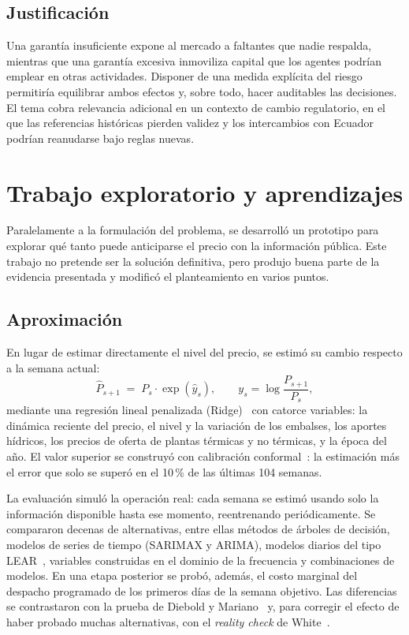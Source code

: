 \documentclass[11pt,letterpaper]{article}
\begin{document}
\subsection{Justificación}

Una garantía insuficiente expone al mercado a faltantes que nadie
respalda, mientras que una garantía excesiva inmoviliza capital que los
agentes podrían emplear en otras actividades. Disponer de una medida
explícita del riesgo permitiría equilibrar ambos efectos y, sobre todo,
hacer auditables las decisiones. El tema cobra relevancia adicional en
un contexto de cambio regulatorio, en el que las referencias históricas
pierden validez y los intercambios con Ecuador podrían reanudarse bajo
reglas nuevas.

\section{Trabajo exploratorio y aprendizajes}
\label{sec:avance}

Paralelamente a la formulación del problema, se desarrolló un prototipo
para explorar qué tanto puede anticiparse el precio con la información
pública. Este trabajo no pretende ser la solución definitiva, pero
produjo buena parte de la evidencia presentada y modificó el
planteamiento en varios puntos.

\subsection{Aproximación}

En lugar de estimar directamente el nivel del precio, se estimó su
cambio respecto a la semana actual:
\begin{equation}
  \hat P_{s+1} \;=\; P_s\cdot\exp(\hat y_s),\qquad
  y_s=\log\frac{P_{s+1}}{P_s},
\end{equation}
mediante una regresión lineal penalizada (Ridge)~\cite{hoerl1970} con
catorce variables: la dinámica reciente del precio, el nivel y la
variación de los embalses, los aportes hídricos, los precios de oferta
de plantas térmicas y no térmicas, y la época del año. El valor superior
se construyó con calibración conformal~\cite{vovk2005}: la estimación más
el error que solo se superó en el 10\,\% de las últimas 104 semanas.

La evaluación simuló la operación real: cada semana se estimó usando
solo la información disponible hasta ese momento, reentrenando
periódicamente. Se compararon decenas de alternativas, entre ellas
métodos de árboles de decisión, modelos de series de tiempo (SARIMAX y
ARIMA), modelos diarios del tipo LEAR~\cite{lago2021}, variables
construidas en el dominio de la frecuencia y combinaciones de modelos.
En una etapa posterior se probó, además, el costo marginal del despacho
programado de los primeros días de la semana objetivo. Las diferencias se
contrastaron con la prueba de Diebold y Mariano~\cite{diebold1995} y, para
corregir el efecto de haber probado muchas alternativas, con el
\emph{reality check} de White~\cite{white2000}.
\end{document}
